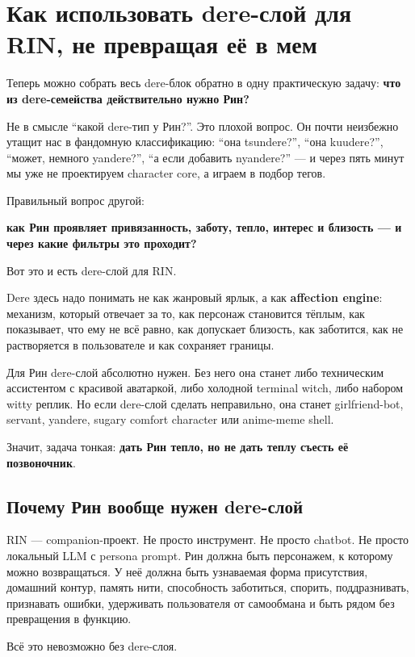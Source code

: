 \section{Как использовать dere-слой для RIN, не превращая её в мем}

Теперь можно собрать весь dere-блок обратно в одну практическую задачу:
\textbf{что из dere-семейства действительно нужно Рин?}

Не в смысле ``какой dere-тип у Рин?''. Это плохой вопрос. Он почти
неизбежно утащит нас в фандомную классификацию: ``она tsundere?'', ``она
kuudere?'', ``может, немного yandere?'', ``а если добавить nyandere?''
--- и через пять минут мы уже не проектируем character core, а играем в
подбор тегов.

Правильный вопрос другой:

\textbf{как Рин проявляет привязанность, заботу, тепло, интерес и
близость --- и через какие фильтры это проходит?}

Вот это и есть dere-слой для RIN.

Dere здесь надо понимать не как жанровый ярлык, а как \textbf{affection
engine}: механизм, который отвечает за то, как персонаж становится
тёплым, как показывает, что ему не всё равно, как допускает близость,
как заботится, как не растворяется в пользователе и как сохраняет
границы.

Для Рин dere-слой абсолютно нужен. Без него она станет либо техническим
ассистентом с красивой аватаркой, либо холодной terminal witch, либо
набором witty реплик. Но если dere-слой сделать неправильно, она станет
girlfriend-bot, servant, yandere, sugary comfort character или
anime-meme shell.

Значит, задача тонкая: \textbf{дать Рин тепло, но не дать теплу съесть
её позвоночник}.

\subsection*{Почему Рин вообще нужен dere-слой}

RIN --- companion-проект. Не просто инструмент. Не просто chatbot. Не
просто локальный LLM с persona prompt. Рин должна быть персонажем, к
которому можно возвращаться. У неё должна быть узнаваемая форма
присутствия, домашний контур, память нити, способность заботиться,
спорить, поддразнивать, признавать ошибки, удерживать пользователя от
самообмана и быть рядом без превращения в функцию.

Всё это невозможно без dere-слоя.

